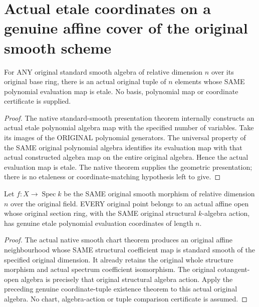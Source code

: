 \section{Actual etale coordinates on a genuine affine cover of the original smooth scheme}
\label{sec:smooth-etale-affine-cover}

\begin{lemma}
\label{lem:cartier-standard-smooth-actual-etale-coordinates}
\leanok
For ANY original standard smooth algebra of relative dimension $n$
over its original base ring, there is an actual original tuple of
$n$ elements whose SAME polynomial evaluation map is etale. No
basis, polynomial map or coordinate certificate is supplied.
\end{lemma}
\begin{proof}
The native standard-smooth presentation theorem internally constructs
an actual etale polynomial algebra map with the specified number of
variables. Take its images of the ORIGINAL polynomial generators.
The universal property of the SAME original polynomial algebra
identifies its evaluation map with that actual constructed algebra
map on the entire original algebra. Hence the actual evaluation
map is etale. The native theorem supplies the geometric presentation;
there is no etaleness or coordinate-matching hypothesis left to give.
\end{proof}

\begin{theorem}
\label{lem:cartier-smooth-original-point-etale-chart}
\leanok
Let $f:X\to\operatorname{Spec}k$ be the SAME original smooth morphism
of relative dimension $n$ over the original field. EVERY original
point belongs to an actual affine open whose original section ring,
with the SAME original structural $k$-algebra action, has genuine
etale polynomial evaluation coordinates of length $n$.
\end{theorem}
\begin{proof}
The actual native smooth chart theorem produces an original affine
neighbourhood whose SAME structural coefficient map is standard
smooth of the specified original dimension. It already retains the
original whole structure morphism and actual spectrum coefficient
isomorphism. The original cotangent-open algebra is precisely that
original structural algebra action. Apply the preceding genuine
coordinate-tuple existence theorem to this actual original algebra.
No chart, algebra-action or tuple comparison certificate is assumed.
\end{proof}

